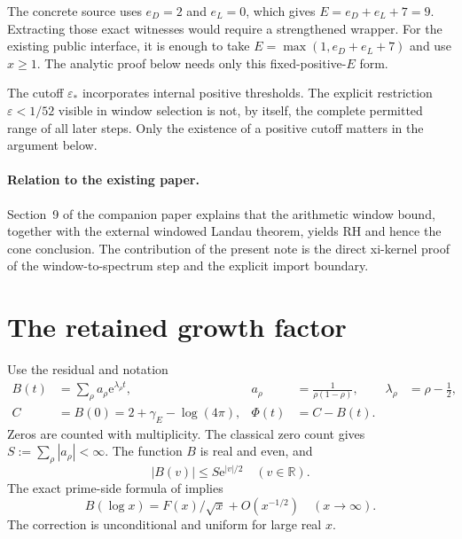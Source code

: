 \documentclass[11pt,a4paper]{article}
\theoremstyle{remark}\newtheorem{remark}[theorem]{Remark}
\newcommand{\e}{\mathrm e}
\begin{document}
The concrete source uses \(e_D=2\) and \(e_L=0\), which gives
\(E=e_D+e_L+7=9\). Extracting those exact witnesses would require
a strengthened wrapper. For the existing public interface, it is
enough to take \(E=\max(1,e_D+e_L+7)\) and use \(x\ge1\).
The analytic proof below needs only this fixed-positive-\(E\) form.

The cutoff \(\varepsilon_*\) incorporates internal positive
thresholds. The explicit restriction \(\varepsilon<1/52\) visible
in window selection is not, by itself, the complete permitted range
of all later steps. Only the existence of a positive cutoff matters
in the argument below.

\paragraph{Relation to the existing paper.}
Section~9 of the companion paper \cite{Polak} explains that
the arithmetic window bound, together with the external windowed
Landau theorem, yields RH and hence the cone conclusion. The
contribution of the present note is the direct xi-kernel proof of
the window-to-spectrum step and the explicit import boundary.

\section{The retained growth factor}
Use the residual and notation
\begin{align}
 B(t)&=\sum_\rho a_\rho\e^{\lambda_\rho t},&
 a_\rho&=\frac1{\rho(1-\rho)},&
 \lambda_\rho&=\rho-\frac12,\label{eq:B}\\
 C&=B(0)=2+\gamma_E-\log(4\pi),&
 \Phi(t)&=C-B(t).\nonumber
\end{align}
Zeros are counted with multiplicity. The classical zero count gives
\(S:=\sum_\rho|a_\rho|<\infty\). The function \(B\) is real and
even, and
\begin{equation}
 |B(v)|\le S\e^{|v|/2}\quad(v\in\mathbb R).\label{eq:Bbound}
\end{equation}
The exact prime-side formula of \cite{Polak} implies
\begin{equation}
 B(\log x)=F(x)/\sqrt{x}+O(x^{-1/2})\quad(x\to\infty).
 \label{eq:BF}
\end{equation}
The correction is unconditional and uniform for large real \(x\).
\end{document}
